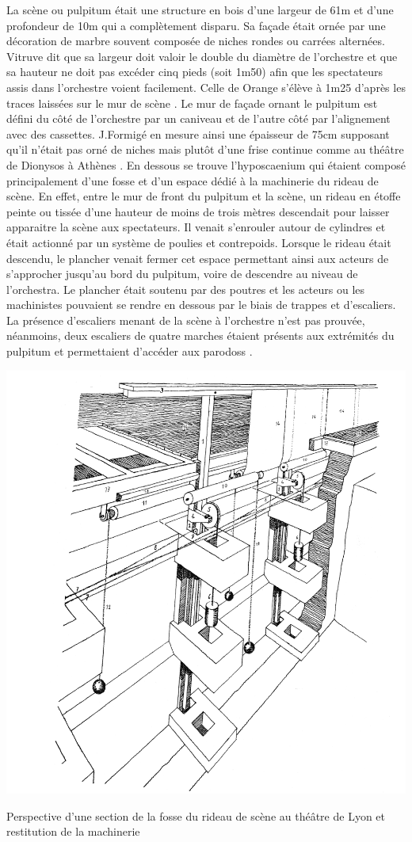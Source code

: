 		La scène ou \gls{pulpitum} était une structure en bois d'une largeur de 61m et d'une profondeur de 10m qui a complètement disparu. Sa façade était ornée par une décoration de marbre souvent composée de niches rondes ou carrées alternées. Vitruve \cite[p. 10-11]{vitruve} dit que sa largeur doit valoir le double du diamètre de l'orchestre et que sa hauteur ne doit pas excéder cinq pieds (soit 1m50) afin que les spectateurs assis dans l'orchestre voient facilement. Celle de Orange s'élève à 1m25 d'après les traces laissées sur le mur de scène \cite[p. 318-319]{orangeTxt}. Le mur de façade ornant le \gls{pulpitum} est défini du côté de l'orchestre par un caniveau et de l'autre côté par l'alignement avec des cassettes. J.Formigé en mesure ainsi une épaisseur de 75cm supposant qu'il n'était pas orné de niches mais plutôt d'une frise continue comme au théâtre de Dionysos à Athènes \cite[p. 457]{formigeBis}. En dessous se trouve l'\gls{hyposcaenium} qui étaient composé principalement d'une fosse et d'un espace dédié à la machinerie du rideau de scène. En effet, entre le mur de front du \gls{pulpitum} et la scène, un rideau en étoffe peinte ou tissée d'une hauteur de moins de trois mètres descendait pour laisser apparaitre la scène aux spectateurs. Il venait s'enrouler autour de cylindres et était actionné par un système de poulies et contrepoids. Lorsque le rideau était descendu, le plancher venait fermer cet espace permettant ainsi aux acteurs de s'approcher jusqu'au bord du \gls{pulpitum}, voire de descendre au niveau de l'\gls{orchestra}. Le plancher était soutenu par des poutres et les acteurs ou les machinistes pouvaient se rendre en dessous par le biais de trappes et d'escaliers. La présence d'escaliers menant de la scène à l'orchestre n'est pas prouvée, néanmoins, deux escaliers de quatre marches étaient présents aux extrémités du \gls{pulpitum} et permettaient d'accéder aux \glspl{parodos} \cite[p. 458]{formigeBis}.
		
	\begin{figureth}
		\includegraphics[width=0.6\linewidth]{images/rideau}
		\caption[Perspective d’une section de la fosse du rideau de scène au théâtre de Lyon]{Perspective d’une section de la fosse du rideau de scène au théâtre de Lyon et restitution de la machinerie \footnotemark}
	\end{figureth}
						
